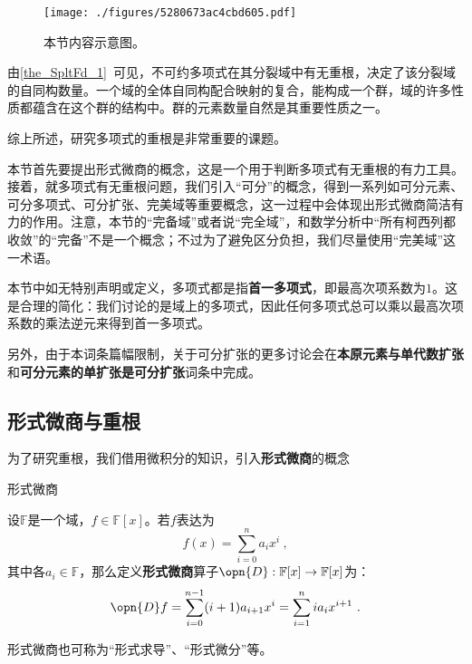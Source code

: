 



\begin{figure}[ht]
\centering
\texttt{[image: ./figures/5280673ac4cbd605.pdf]}
\caption{本节内容示意图。} \label{fig_SprbEx_1}
\end{figure}


由\autoref{the_SpltFd_1}~可见，不可约多项式在其分裂域中有无重根，决定了该分裂域的自同构数量。一个域的全体自同构配合映射的复合，能构成一个群，域的许多性质都蕴含在这个群的结构中。群的元素数量自然是其重要性质之一。

综上所述，研究多项式的重根是非常重要的课题。

本节首先要提出形式微商的概念，这是一个用于判断多项式有无重根的有力工具。接着，就多项式有无重根问题，我们引入“可分”的概念，得到一系列如可分元素、可分多项式、可分扩张、完美域等重要概念，这一过程中会体现出形式微商简洁有力的作用。注意，本节的“完备域”或者说“完全域”，和数学分析中“所有柯西列都收敛”的“完备”不是一个概念；不过为了避免区分负担，我们尽量使用“完美域”这一术语。

本节中如无特别声明或定义，多项式都是指\textbf{首一多项式}，即最高次项系数为$1$。这是合理的简化：我们讨论的是域上的多项式，因此任何多项式总可以乘以最高次项系数的乘法逆元来得到首一多项式。

另外，由于本词条篇幅限制，关于可分扩张的更多讨论会在\textbf{本原元素与单代数扩张}和\textbf{可分元素的单扩张是可分扩张}词条中完成。

\subsection{形式微商与重根}

为了研究重根，我们借用微积分的知识，引入\textbf{形式微商}的概念

\begin{definition}{形式微商}\label{def_SprbEx_1}

设$\mathbb{F}$是一个域，$f\in\mathbb{F}[x]$。若$f$表达为
\begin{equation}
f(x) = \sum_{i=0}^n a_ix^i~,
\end{equation}
其中各$a_i\in\mathbb{F}$，那么定义\textbf{形式微商}算子$\opn{D}:\mathbb{F}[x]\to\mathbb{F}[x]$为：
\begin{equation}
\opn{D}f = \sum_{i=0}^{n-1} (i+1)a_{i+1}x^i = \sum_{i=1}^{n} ia_{i}x^{i+1}~.
\end{equation}

形式微商也可称为“形式求导”、“形式微分”等。

\end{definition}

